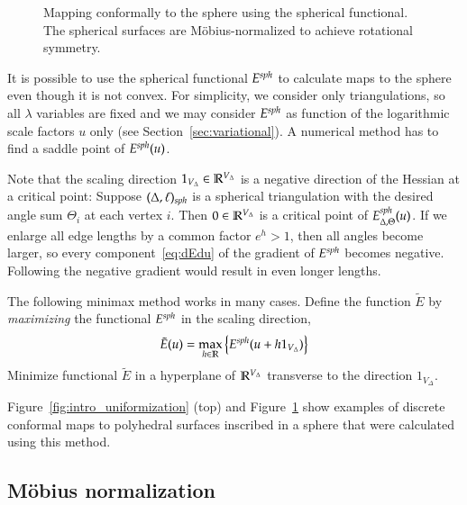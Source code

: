 \documentclass[Thesis]{subfiles}
\begin{document}
\begin{figure}
\centering
{}
\quad\quad\quad\quad\quad{}
\caption{Mapping conformally to the sphere using the spherical
  functional. The spherical surfaces are M{\"o}bius-normalized to
  achieve rotational symmetry.}
\label{fig:spherical_examples}
\end{figure}

It is possible to use the spherical functional $E^{\mathit{sph}}$ to calculate
maps to the sphere even though it is not convex. For simplicity, we
consider only triangulations, so all $\lambda$ variables are fixed and
we may consider $E^{\mathit{sph}}$ as function of the logarithmic scale
factors $u$ only (see Section~\ref{sec:variational}). A numerical
method has to find a saddle point of $E^{\mathit{sph}}(u)$. 

Note that the scaling direction $1_{V_{\Delta}}\in\mathbb R^{V_{\Delta}}$ is
a negative direction of the Hessian at a critical point: Suppose
$(\Delta,\ell)_{\mathit{sph}}$ is a spherical triangulation with the desired
angle sum $\Theta_{i}$ at each vertex $i$. Then $0\in\mathbb R^{V_{\Delta}}$
is a critical point of $E^{\mathit{sph}}_{\Delta,\Theta}(u)$. If we enlarge
all edge lengths by a common factor $e^{h}>1$, then all angles become
larger, so every component~\eqref{eq:dEdu} of the gradient of
$E^{\mathit{sph}}$ becomes negative. Following the negative gradient would
result in even longer lengths.

The following minimax method works in many cases. Define the function
$\tilde E$ by \emph{maximizing} the functional $E^{\mathit{sph}}$ in the
scaling direction,
\begin{equation}
\label{eq:reduced_spherical}
\tilde E(u)=\max_{h\in\mathbb R} \left\{E^{\mathit{sph}}(u + h1_{V_{\Delta}})\right\}
\end{equation}
Minimize functional $\tilde E$ in a hyperplane of $\mathbb R^{V_{\Delta}}$
transverse to the direction $1_{V_{\Delta}}$.

Figure~\ref{fig:intro_uniformization} (top) and
Figure~\ref{fig:spherical_examples} show examples of discrete
conformal maps to polyhedral surfaces inscribed in a sphere that were
calculated using this method.

\subsection{M{\"o}bius normalization}
\label{sec:moebius_normalization}
\end{document}
